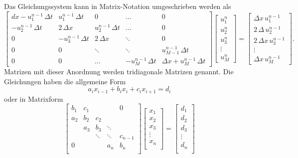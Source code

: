	Das Gleichungssystem kann in Matrix-Notation umgeschrieben werden als
	\begin{equation}
	\left[{\begin{matrix}
	{dx- u_{1}^{n-1}\, \Delta t}&{ u_{1}^{n-1} \, \Delta t}&{0}&{\dots}&{0}\\[5pt]
	{-u_{2}^{n-1} \, \Delta t}&{ 2 \, \Delta x}&{ u_{2}^{n-1} \, \Delta t}&{\dots}&{0}\\[5pt]
	{0}&{-u_{3}^{n-1} \, \Delta t}&{ 2 \, \Delta x}&\ddots &{0}\\[5pt]
	{0}&{0}&\ddots &\ddots &{ u_{M-1}^{n-1} \, \Delta t}\\[5pt]
	{0}&{0}&{\dots}&{-u_{M}^{n-1} \, \Delta t}&{\Delta x + u_{M}^{n-1}\, \Delta t}
	\end{matrix}}
	\right]\left[{\begin{matrix}
	{ u_{1}^{n}}\\[5pt]
	{ u_{2}^{n}}\\[5pt]
	{ u_{3}^{n}}\\[5pt]
	\vdots \\[5pt]
	{ u_{M}^{n}}
	\end{matrix}}\right]
	=\left[{\begin{matrix}
	{\Delta x \, u_{1}^{n-1}}\\[5pt]
	{ 2 \, \Delta  \, u_{2}^{n-1}}\\[5pt]
	{ 2 \, \Delta x \, u_{3}^{n-1}}\\[5pt]
	\vdots \\[5pt]
	{\Delta x \, u_{M}^{n-1}}
	\end{matrix}}\right].
	  \end{equation}
	Matrizen mit dieser Anordnung werden tridiagonale Matrizen genannt.
	Die Gleichungen haben die allgemeine Form
	  \begin{equation}
	    a_{i}x_{{i-1}}+b_{i}x_{i}+c_{i}x_{{i+1}}=d_{i}
	  \end{equation}
	oder in Matrixform
	  \begin{equation}
	    \begin{bmatrix}{b_{1}}&{c_{1}}&{}&{}&{0}\\
	      {a_{2}}&{b_{2}}&{c_{2}}&{}&{}\\
	      {}&{a_{3}}&{b_{3}}&\ddots &{}\\
	      {}&{}&\ddots &\ddots &{c_{n-1}}\\
	      {0}&{}&{}&{a_{n}}&{b_{n}}\\
	      \end{bmatrix}
	      \begin{bmatrix}{x_{1}}\\
	      {x_{2}}\\{x_{3}}\\\vdots \\
	      {x_{n}}\\
	      \end{bmatrix}
	      =
	      \begin{bmatrix}{d_{1}}\\
	      {d_{2}}\\{d_{3}}\\
	      \vdots \\{d_{n}}\\
	    \end{bmatrix}
	  \end{equation}
